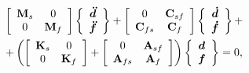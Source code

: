 \begin{multline}

\label{dmg_eq4}

\left[ {\begin{array}{*{20}{c}}

{{{\bf{M}}_s}}&0\\

0&{{{\bf{M}}_f}}

\end{array}} \right]\left\{\begin{array}{c}

                      {\boldsymbol {\ddot d}} \\

                      {\boldsymbol {\ddot f}}

                    \end{array} \right\}

 +  \left[ {\begin{array}{*{20}{c}}

0&{{{\bf{C}}_{sf}}}\\

{{{\bf{C}}_{fs}}}&{{{\bf{C}}_f}}

\end{array}} \right]\left\{\begin{array}{c}

                      {\boldsymbol {\dot d}} \\

                      {\boldsymbol {\dot f}}

                    \end{array} \right\}

                   + \\

 + \left( \left[ {\begin{array}{*{20}{c}}

{{{\bf{K}}_s}}&0\\

0&{{{\bf{K}}_f}}

\end{array}} \right]

+ \left[ {\begin{array}{*{20}{c}}

0&{{{\bf{A}}_{sf}}}\\

{{{\bf{A}}_{fs}}}&{{{\bf{A}}_f}}

\end{array}} \right] \right) \left\{\begin{array}{c}

                      {\boldsymbol d} \\

                      {\boldsymbol f}

                    \end{array} \right\}= 0,

\end{multline}







